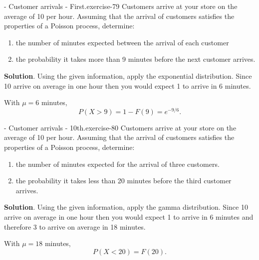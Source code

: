 \documentclass[10pt,]{book}
\numberwithin{equation}{section}
\newcommand{\lt}{<}
\newcommand{\gt}{>}
\begin{document}
%
\par
\hypertarget{p-1168}{}%
\begin{inlineexercise}{- Customer arrivals - First.}{exercise-79}%
\hypertarget{p-1169}{}%
Customers arrive at your store on the average of 10 per hour.  Assuming that the arrival of customers satisfies the properties of a Poisson process, determine: \leavevmode%
\begin{enumerate}
\item\hypertarget{li-302}{}the number of minutes expected between the arrival of each customer%
\item\hypertarget{li-303}{}the probability it takes more than 9 minutes before the next customer arrives.%
\end{enumerate}
 \textbf{Solution}.\quad%
\hypertarget{p-1170}{}%
Using the given information, apply the exponential distribution.  Since 10 arrive on average in one hour then you would expect 1 to arrive in 6 minutes.%
\par
\hypertarget{p-1171}{}%
With \(\mu = 6\) minutes,%
\begin{equation*}
P(X \gt 9) = 1 - F(9) = e^{-9/6}.
\end{equation*}
%
%
\end{inlineexercise}
%
\par
\hypertarget{p-1172}{}%
\begin{inlineexercise}{- Customer arrivals - 10th.}{exercise-80}%
\hypertarget{p-1173}{}%
Customers arrive at your store on the average of 10 per hour.  Assuming that the arrival of customers satisfies the properties of a Poisson process, determine: \leavevmode%
\begin{enumerate}
\item\hypertarget{li-304}{}the number of minutes expected for the arrival of three customers.%
\item\hypertarget{li-305}{}the probability it takes less than 20 minutes before the third customer arrives.%
\end{enumerate}
 \textbf{Solution}.\quad%
\hypertarget{p-1174}{}%
Using the given information, apply the gamma distribution.  Since 10 arrive on average in one hour then you would expect 1 to arrive in 6 minutes and therefore 3 to arrive on average in 18 minutes.%
\par
\hypertarget{p-1175}{}%
With \(\mu = 18\) minutes,%
\begin{equation*}
P(X \lt 20) = F(20).
\end{equation*}
%
%
\end{inlineexercise}
\end{document}
